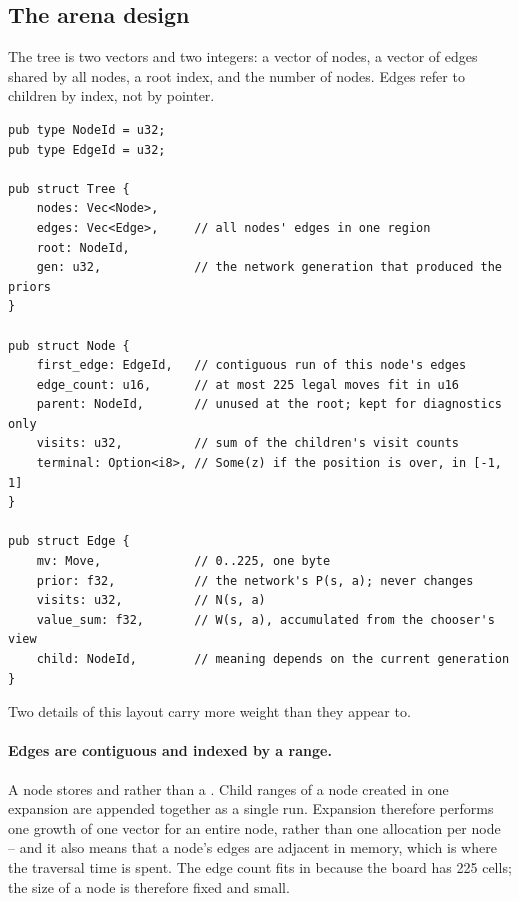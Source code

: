 \subsection{The arena design}
\label{sec:arena}

The tree is two vectors and two integers: a vector of nodes, a vector of edges
shared by all nodes, a root index, and the number of nodes. Edges refer to
children by index, not by pointer.

\begin{lstlisting}[style=rust,caption={The arena. Node ids and edge ids are
integers; no node owns another.},label={lst:arena}]
pub type NodeId = u32;
pub type EdgeId = u32;

pub struct Tree {
    nodes: Vec<Node>,
    edges: Vec<Edge>,     // all nodes' edges in one region
    root: NodeId,
    gen: u32,             // the network generation that produced the priors
}

pub struct Node {
    first_edge: EdgeId,   // contiguous run of this node's edges
    edge_count: u16,      // at most 225 legal moves fit in u16
    parent: NodeId,       // unused at the root; kept for diagnostics only
    visits: u32,          // sum of the children's visit counts
    terminal: Option<i8>, // Some(z) if the position is over, in [-1, 1]
}

pub struct Edge {
    mv: Move,             // 0..225, one byte
    prior: f32,           // the network's P(s, a); never changes
    visits: u32,          // N(s, a)
    value_sum: f32,       // W(s, a), accumulated from the chooser's view
    child: NodeId,        // meaning depends on the current generation
}
\end{lstlisting}

Two details of this layout carry more weight than they appear to.

\paragraph{Edges are contiguous and indexed by a range.} A node stores
 and  rather than a . Child
ranges of a node created in one expansion are appended together as a single run.
Expansion therefore performs one growth of one vector for an entire node, rather
than one allocation per node -- and it also means that a node's edges are
adjacent in memory, which is where the traversal time is spent. The edge count
fits in  because the board has 225 cells; the size of a node is
therefore fixed and small.

